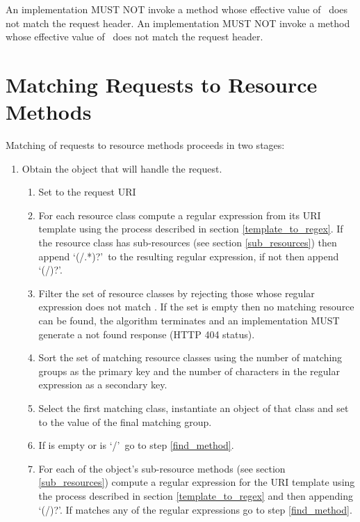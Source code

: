 An implementation MUST NOT invoke a method whose effective value of \ProduceMime\ does not match the request  header. An implementation MUST NOT invoke a method whose effective value of \ConsumeMime\ does not match the request  header.

\section{Matching Requests to Resource Methods}
\label{mapping_requests_to_java_methods}

Matching of requests to resource methods proceeds in two stages:

\begin{enumerate}
\item Obtain the object that will handle the request.

\begin{enumerate}
\item Set  to the request URI

\item For each resource class compute a regular expression from its URI template using the process described in section \ref{template_to_regex}. If the resource class has sub-resources (see section \ref{sub_resources}) then append \lq(/.*)?\rq\ to the resulting regular expression, if not then append \lq(/)?\rq.

\item Filter the set of resource classes by rejecting those whose regular expression does not match . If the set is empty then no matching resource can be found, the algorithm terminates and an implementation MUST generate a not found response (HTTP 404 status).

\item Sort the set of matching resource classes using the number of matching groups as the primary key and the number of characters in the regular expression as a secondary key.

\item Select the first matching class, instantiate an object of that class and set  to the value of the final matching group.

\item\label{check_uri} If  is empty or is \lq/\rq\ go to step \ref{find_method}.

\item For each of the object's sub-resource methods (see section \ref{sub_resources}) compute a regular expression for the URI template using the process described in section \ref{template_to_regex} and then appending \lq(/)?\rq. If  matches any of the regular expressions go to step \ref{find_method}.


\end{enumerate}
\end{enumerate}
